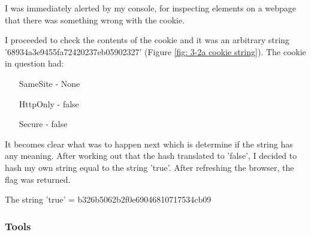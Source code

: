 I was immediately alerted by my console, for inspecting elements on
a webpage that there was something wrong with the cookie.

I proceeded to check the contents of the cookie and it was
an arbitrary string '68934a3e9455fa72420237eb05902327' (Figure \vref{fig: 3-2a cookie string}). The
cookie in question had:
\begin{itemize}
    \item[SameSite] - None
    \item[HttpOnly] - false
    \item[Secure] - false
\end{itemize}
It becomes clear what was to happen next which is determine if the string
has any meaning. After working out that the hash translated to 'false', I
decided to hash my own string equal to the string 'true'.
After refreshing the browser, the flag was returned.

The string 'true' = b326b5062b2f0e69046810717534cb09

\subsubsection{Tools}

